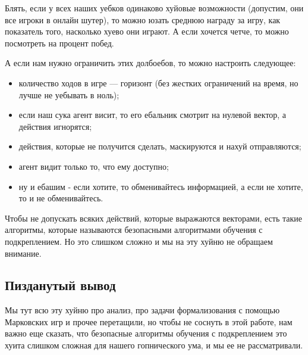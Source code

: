 Блять, если у всех наших уебков одинаково хуйовые возможности (допустим, они все игроки в онлайн шутер), то можно юзать среднюю награду за игру, как показатель того, насколько хуево они играют. А если хочется четче, то можно посмотреть на процент побед.

\pagebreak

А если нам нужно ограничить этих долбоебов, то можно настроить следующее:

\begin{itemize}[label=---]
\item количество ходов в игре --- горизонт (без жестких ограничений на время, но лучше не уебывать в ноль);
\item если наш сука агент висит, то его ебальник смотрит на нулевой вектор, а действия игнорятся;
\item действия, которые не получится сделать, маскируются и нахуй отправляются;
\item агент видит только то, что ему доступно;
\item ну и ебашим - если хотите, то обменивайтесь информацией, а если не хотите, то и не обменивайтесь.
\end{itemize}
Чтобы не допускать всяких действий, которые выражаются векторами, есть такие алгоритмы, которые называются безопасными алгоритмами обучения с подкреплением. Но это слишком сложно и мы на эту хуйню не обращаем внимание.

\subsection*{Пизданутый вывод}

Мы тут всю эту хуйню про анализ, про задачи формализования с помощью Марковских игр и прочее перетащили, но чтобы не соснуть в этой работе, нам важно еще сказать, что безопасные алгоритмы обучения с подкреплением это хуита слишком сложная для нашего гопнического ума, и мы ее не рассматривали.